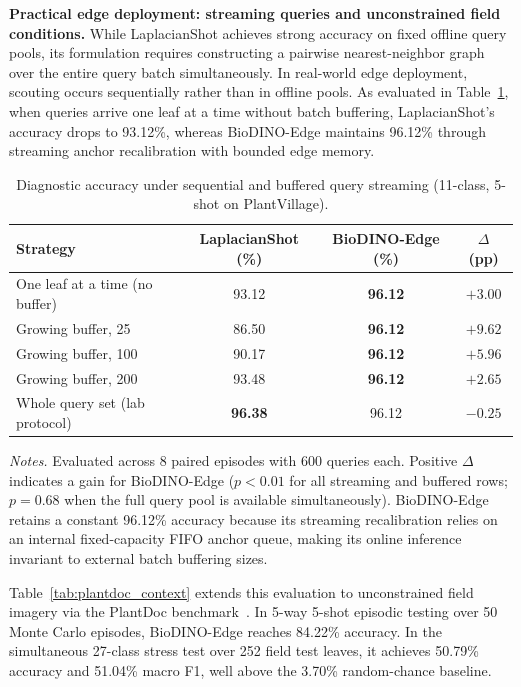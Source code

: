 \documentclass[preprint,12pt]{elsarticle}
\begin{document}
\textbf{Practical edge deployment: streaming queries and unconstrained field conditions.} While LaplacianShot achieves strong accuracy on fixed offline query pools, its formulation requires constructing a pairwise nearest-neighbor graph over the entire query batch simultaneously. In real-world edge deployment, scouting occurs sequentially rather than in offline pools. As evaluated in Table~\ref{tab:batchsize}, when queries arrive one leaf at a time without batch buffering, LaplacianShot's accuracy drops to 93.12\%, whereas BioDINO-Edge maintains 96.12\% through streaming anchor recalibration with bounded edge memory.

\begin{table}[htbp]
\caption{Diagnostic accuracy under sequential and buffered query streaming (11-class, 5-shot on PlantVillage).}
\label{tab:batchsize}
\centering

\footnotesize
\setlength{\tabcolsep}{4pt}
\begin{tabular*}{\columnwidth}{@{\extracolsep{\fill}}lccc}
\toprule
\textbf{Strategy} & \textbf{LaplacianShot (\%)} & \textbf{BioDINO-Edge (\%)} & \textbf{$\Delta$ (pp)} \\
\midrule
One leaf at a time (no buffer) & 93.12 & \textbf{96.12} & $+3.00$ \\
Growing buffer, 25 & 86.50 & \textbf{96.12} & $+9.62$ \\
Growing buffer, 100 & 90.17 & \textbf{96.12} & $+5.96$ \\
Growing buffer, 200 & 93.48 & \textbf{96.12} & $+2.65$ \\
Whole query set (lab protocol) & \textbf{96.38} & 96.12 & $-0.25$ \\
\bottomrule
\end{tabular*}

\vspace{3pt}
\begin{minipage}{\columnwidth}
\footnotesize
\textit{Notes.} Evaluated across 8 paired episodes with 600 queries each. Positive $\Delta$ indicates a gain for BioDINO-Edge ($p < 0.01$ for all streaming and buffered rows; $p = 0.68$ when the full query pool is available simultaneously). BioDINO-Edge retains a constant 96.12\% accuracy because its streaming recalibration relies on an internal fixed-capacity FIFO anchor queue, making its online inference invariant to external batch buffering sizes.
\end{minipage}
\end{table}

Table~\ref{tab:plantdoc_context} extends this evaluation to unconstrained field imagery via the PlantDoc benchmark~\cite{singh2020plantdoc}. In 5-way 5-shot episodic testing over 50 Monte Carlo episodes, BioDINO-Edge reaches 84.22\% accuracy. In the simultaneous 27-class stress test over 252 field test leaves, it achieves 50.79\% accuracy and 51.04\% macro F1, well above the 3.70\% random-chance baseline.
\end{document}
